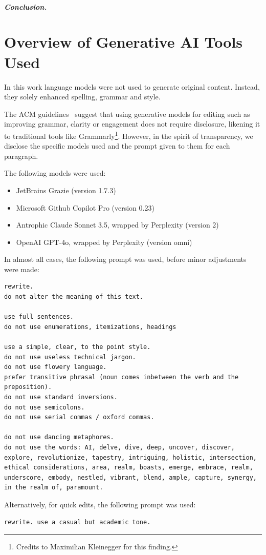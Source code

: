 \documentclass[a4paper, oneside]{discothesis}
\begin{document}
\paragraph{Conclusion.}








\bigskip



\appendix


\chapter*{Overview of Generative AI Tools Used}

In this work language models were not used to generate original content. Instead, they solely enhanced spelling, grammar and style.

The ACM guidelines~\cite{acm_authorship_2024} suggest that using generative models for editing \textendash{} such as improving grammar, clarity or engagement \textendash{} does not require disclosure, likening it to traditional tools like Grammarly\footnote{Credits to Maximilian Kleinegger for this finding.}. However, in the spirit of transparency, we disclose the specific models used and the prompt given to them for each paragraph.

The following models were used:

\begin{itemize}
	\item JetBrains Grazie (version 1.7.3)
	\item Microsoft Github Copilot Pro (version 0.23)
	\item Antrophic Claude Sonnet 3.5, wrapped by Perplexity (version 2)
	\item OpenAI GPT-4o, wrapped by Perplexity (version omni)
\end{itemize}

In almost all cases, the following prompt was used, before minor adjustments were made:

\begin{verbatim}
rewrite.
do not alter the meaning of this text.

use full sentences.
do not use enumerations, itemizations, headings

use a simple, clear, to the point style.
do not use useless technical jargon.
do not use flowery language.
prefer transitive phrasal (noun comes inbetween the verb and the preposition).
do not use standard inversions.
do not use semicolons.
do not use serial commas / oxford commas.

do not use dancing metaphores.
do not use the words: AI, delve, dive, deep, uncover, discover, explore, revolutionize, tapestry, intriguing, holistic, intersection, ethical considerations, area, realm, boasts, emerge, embrace, realm, underscore, embody, nestled, vibrant, blend, ample, capture, synergy, in the realm of, paramount.
\end{verbatim}

Alternatively, for quick edits, the following prompt was used:

\begin{verbatim}
rewrite. use a casual but academic tone.
\end{verbatim}
\end{document}
